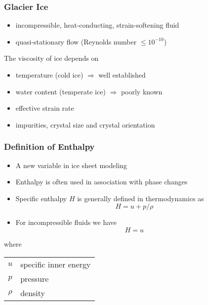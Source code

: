 \documentclass[hide notes,intlimits]{beamer}
\begin{document}
\begin{frame}
  \frametitle{Glacier Ice}
  \begin{itemize}
    \item incompressible, heat-conducting, strain-softening fluid
    \item quasi-stationary flow (Reynolds number $\le 10^{-10}$)
  \end{itemize}
  The \alert{viscosity} of ice depends on
  \begin{itemize}
    \item<1> temperature (cold ice) $\Rightarrow$ well established
    \item<1> water content (temperate ice) $\Rightarrow$ poorly known
    \item<1> effective strain rate
    \item<1> impurities, crystal size and crystal orientation
  \end{itemize}
\end{frame}


\begin{frame}
  \frametitle{Definition of Enthalpy}
  \begin{itemize}
  \item A new variable in ice sheet modeling
  \item Enthalpy is often used in association with phase changes
  \item \alert{Specific enthalpy ${H}$} is generally defined in thermodynamics as
    \begin{displaymath}
      {H} = u + p/\rho
    \end{displaymath}
  \item For incompressible fluids we have  
    \begin{displaymath}
      {H} = u
    \end{displaymath}
  \end{itemize}
  where 
  \begin{center}
    \begin{tabular}{cl}
      $u$ & specific inner energy\\
      $p$ & pressure\\
      $\rho$ & density
    \end{tabular}
  \end{center}
\end{frame}
\end{document}
